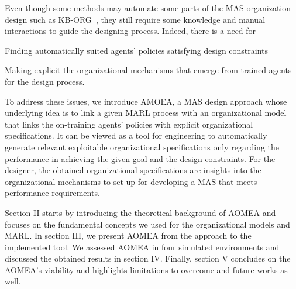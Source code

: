 \documentclass[runningheads]{llncs}
\begin{document}

Even though some methods may automate some parts of the MAS organization design such as KB-ORG~\cite{Sims2008}, they still require some knowledge and manual interactions to guide the designing process. Indeed, there is a need for
\begin{enumerate*}[label=\roman*),itemjoin={; and \ }]
    \item Finding automatically suited agents' policies satisfying design constraints
    \item Making explicit the organizational mechanisms that emerge from trained agents for the design process.
\end{enumerate*}


To address these issues, we introduce AMOEA, a MAS design approach whose underlying idea is to link a given MARL process with an organizational model that links the on-training agents' policies with explicit organizational specifications. It can be viewed as a tool for engineering to automatically generate relevant exploitable organizational specifications only regarding the performance in achieving the given goal and the design constraints. For the designer, the obtained organizational specifications are insights into the organizational mechanisms to set up for developing a MAS that meets performance requirements.



Section II starts by introducing the theoretical background of AOMEA and focuses on the fundamental concepts we used for the organizational models and MARL.
In section III, we present AOMEA from the approach to the implemented tool. We assessed AOMEA in four simulated environments and discussed the obtained results in section IV. Finally, section V concludes on the AOMEA's viability and highlights limitations to overcome and future works as well.
\end{document}
